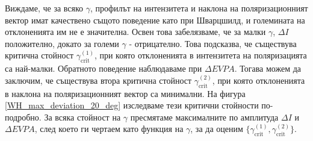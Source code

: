 Виждаме, че за всяко $\gamma$, профилът на интензитета и наклона на поляризационният вектор имат качествено същото поведение като при Шварцшилд, и големината на отклоненията им не е значителна. Освен това забелязваме, че за малки $\gamma$, $\Delta I$ положително, докато за големи $\gamma$ - отрицателно. Това подсказва, че съществува критична стойност $\gamma_\text{crit}^{(1)}$, при която отклоненията в интензитета на поляризацията са най-малки. Обратното поведение наблюдаваме при $\Delta EVPA$. Тогава можем да заключим, че съществува втора критична стойност $\gamma_\text{crit}^{(2)}$, при която отклоненията в наклона на поляризационният вектор са минимални. На фигура \ref{WH_max_deviation_20_deg} изследваме тези критични стойности по-подробно. За всяка стойност на $\gamma$ пресмятаме максималните по амплитуда $\Delta I$ и $\Delta EVPA$, след което ги чертаем като функция на $\gamma$, за да оценим $\{\gamma_\text{crit}^{(1)}, \gamma_\text{crit}^{(2)}\}$.

